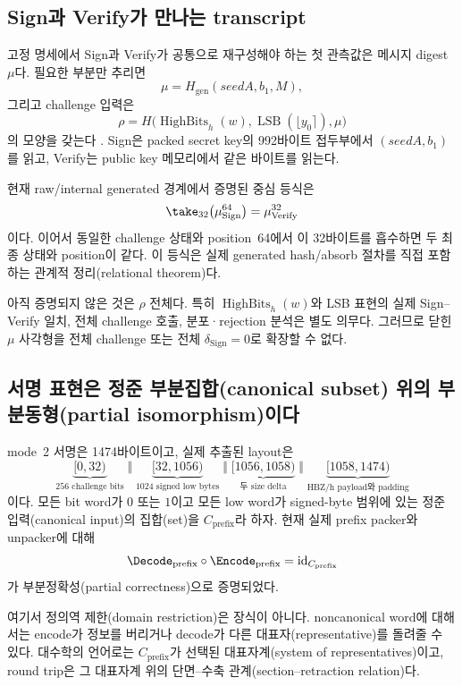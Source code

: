 \subsection{Sign과 Verify가 만나는 transcript}

고정 명세에서 Sign과 Verify가 공통으로 재구성해야 하는 첫 관측값은 메시지
digest \(\mu\)다. 필요한 부분만 추리면
\[
  \mu=H_{\mathrm{gen}}(\mathit{seedA},b_1,M),
\]
그리고 challenge 입력은
\[
  \rho=H\bigl(
      \operatorname{HighBits}_h(w),
      \operatorname{LSB}(\lfloor y_0\rceil),
      \mu\bigr)
\]
의 모양을 갖는다 \cite{haetae-spec}. Sign은 packed secret key의 992바이트
접두부에서 \((\mathit{seedA},b_1)\)를 읽고, Verify는 public key 메모리에서
같은 바이트를 읽는다.

현재 raw/internal generated 경계에서 증명된 중심 등식은
\[
  \take_{32}\bigl(\mu_{\mathrm{Sign}}^{64}\bigr)
  =\mu_{\mathrm{Verify}}^{32}
\]
이다. 이어서 동일한 challenge 상태와 position~64에서 이 32바이트를 흡수하면
두 최종 상태와 position이 같다. 이 등식은 실제 generated hash/absorb 절차를
직접 포함하는 관계적 정리(relational theorem)다.

아직 증명되지 않은 것은 \(\rho\) 전체다. 특히
\(\operatorname{HighBits}_h(w)\)와 LSB 표현의 실제 Sign--Verify 일치,
전체 challenge 호출, 분포·rejection 분석은 별도 의무다. 그러므로 닫힌
\(\mu\) 사각형을 전체 challenge 또는 전체 \(\delta_{\mathrm{Sign}}=0\)로
확장할 수 없다.

\subsection{서명 표현은 정준 부분집합(canonical subset) 위의 부분동형(partial isomorphism)이다}

mode~2 서명은 1474바이트이고, 실제 추출된 layout은
\[
\underbrace{[0,32)}_{256\text{ challenge bits}}
\;\Vert\;
\underbrace{[32,1056)}_{1024\text{ signed low bytes}}
\;\Vert\;
\underbrace{[1056,1058)}_{\text{두 size delta}}
\;\Vert\;
\underbrace{[1058,1474)}_{\text{HBZ/h payload와 padding}}
\]
이다. 모든 bit word가 \(0\) 또는 \(1\)이고 모든 low word가 signed-byte
범위에 있는 정준 입력(canonical input)의 집합(set)을
\(C_{\mathrm{prefix}}\)라 하자. 현재 실제
prefix packer와 unpacker에 대해
\[
  \Decode_{\mathrm{prefix}}\circ
  \Encode_{\mathrm{prefix}}
  =\operatorname{id}_{C_{\mathrm{prefix}}}
\]
가 부분정확성(partial correctness)으로 증명되었다.

여기서 정의역 제한(domain restriction)은 장식이 아니다. noncanonical word에
대해서는 encode가 정보를 버리거나 decode가 다른 대표자(representative)를
돌려줄 수 있다. 대수학의 언어로는 \(C_{\mathrm{prefix}}\)가 선택된
대표자계(system of representatives)이고, round trip은 그 대표자계 위의
단면--수축 관계(section--retraction relation)다.

